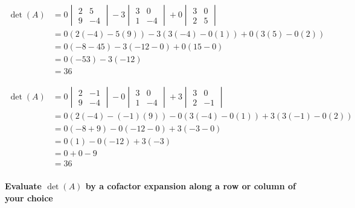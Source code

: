 \documentclass[
  letterpaper,
  DIV=11,
  numbers=noendperiod]{scrartcl}
\let\oldparagraph\paragraph
\renewcommand{\paragraph}[1]{\oldparagraph{#1}\mbox{}}
\begin{document}
\begin{align*}
\det(A) &= 0\begin{vmatrix}2 & 5 \\ 9 & -4\end{vmatrix}-3\begin{vmatrix}3 & 0 \\ 1 & -4\end{vmatrix}+0\begin{vmatrix}3 & 0 \\ 2 & 5\end{vmatrix} \\
&= 0(2(-4)-5(9))-3(3(-4)-0(1))+0(3(5)-0(2)) \\
&= 0(-8-45)-3(-12-0)+0(15-0) \\
&= 0(-53)-3(-12) \\
&= 36
\end{align*}

\begin{align*}
\det(A) &= 0\begin{vmatrix}2 & -1 \\ 9 & -4\end{vmatrix}-0\begin{vmatrix}3 & 0 \\ 1 & -4\end{vmatrix}+3\begin{vmatrix}3 & 0 \\ 2 & -1\end{vmatrix} \\
&= 0(2(-4)-(-1)(9))-0(3(-4)-0(1))+3(3(-1)-0(2)) \\
&= 0(-8+9)-0(-12-0)+3(-3-0) \\
&= 0(1)-0(-12)+3(-3) \\
&= 0+0-9 \\
&= 36
\end{align*}

\newpage{}

\hypertarget{evaluate-deta-by-a-cofactor-expansion-along-a-row-or-column-of-your-choice}{%
\paragraph{\texorpdfstring{Evaluate \(\det(A)\) by a cofactor expansion
along a row or column of your
choice}{Evaluate \textbackslash det(A) by a cofactor expansion along a row or column of your choice}}\label{evaluate-deta-by-a-cofactor-expansion-along-a-row-or-column-of-your-choice}}
\end{document}
